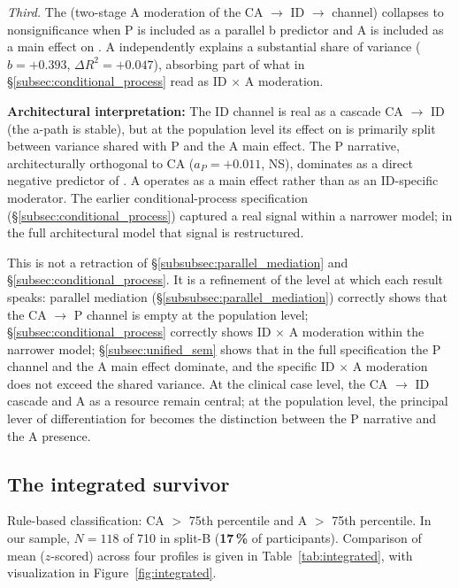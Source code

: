 \textit{Third.} The \IMM{} (two-stage A moderation of the CA $\to$ ID $\to$ \EAF{} channel) collapses to nonsignificance when P is included as a parallel b predictor and A is included as a main effect on \EAF{}. A independently explains a substantial share of \EAF{} variance ($b = +0.393$, $\Delta R^2 = +0.047$), absorbing part of what in §\ref{subsec:conditional_process} read as ID $\times$ A moderation.

\textbf{Architectural interpretation:} The ID channel is real as a cascade CA $\to$ ID (the a-path is stable), but at the population level its effect on \EAF{} is primarily split between variance shared with P and the A main effect. The P narrative, architecturally orthogonal to CA ($a_P = +0.011$, NS), dominates as a direct negative predictor of \EAF{}. A operates as a main effect rather than as an ID-specific moderator. The earlier conditional-process specification (§\ref{subsec:conditional_process}) captured a real signal within a narrower model; in the full architectural model that signal is restructured.

This is not a retraction of §\ref{subsubsec:parallel_mediation} and §\ref{subsec:conditional_process}. It is a refinement of the level at which each result speaks: parallel mediation (§\ref{subsubsec:parallel_mediation}) correctly shows that the CA $\to$ P channel is empty at the population level; §\ref{subsec:conditional_process} correctly shows ID $\times$ A moderation within the narrower model; §\ref{subsec:unified_sem} shows that in the full specification the P channel and the A main effect dominate, and the specific ID $\times$ A moderation does not exceed the shared variance. At the clinical case level, the CA $\to$ ID cascade and A as a resource remain central; at the population level, the principal lever of differentiation for \EAF{} becomes the distinction between the P narrative and the A presence.

\subsection{The integrated survivor}
\label{subsec:integrated}

Rule-based classification: CA $>$ 75th percentile and A $>$ 75th percentile. In our sample, $N = 118$ of 710 in split-B (\textbf{17\,\%} of participants). Comparison of mean \EAF{} ($z$-scored) across four profiles is given in Table~\ref{tab:integrated}, with visualization in Figure~\ref{fig:integrated}.

